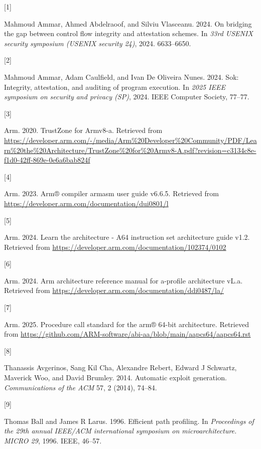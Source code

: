 \documentclass[a4paper, nobind]{templates/ociamthesis}
\newlength{\cslhangindent}
\newlength{\csllabelwidth}
\newenvironment{CSLReferences}[2] %
{\begin{list}{}{%
	\setlength{\itemindent}{0pt}
	\setlength{\leftmargin}{0pt}
	\setlength{\parsep}{0pt}
	\ifodd #1
	\setlength{\leftmargin}{\cslhangindent}
	\setlength{\itemindent}{-1\cslhangindent}
	\fi
	\setlength{\itemsep}{#2\baselineskip}}}
{\end{list}}
\newcommand{\CSLLeftMargin}[1]{\parbox[t]{\csllabelwidth}{\strut#1\strut}}
\newcommand{\CSLRightInline}[1]{\parbox[t]{\linewidth - \csllabelwidth}{\strut#1\strut}}
\begin{document}

\label{refs}
\begin{CSLReferences}{0}{0}
\CSLLeftMargin{{[}1{]} }%
\CSLRightInline{Mahmoud Ammar, Ahmed Abdelraoof, and Silviu Vlasceanu. 2024. On bridging the gap between control flow integrity and attestation schemes. In \emph{33rd USENIX security symposium (USENIX security 24)}, 2024. 6633--6650.}

\CSLLeftMargin{{[}2{]} }%
\CSLRightInline{Mahmoud Ammar, Adam Caulfield, and Ivan De Oliveira Nunes. 2024. Sok: Integrity, attestation, and auditing of program execution. In \emph{2025 IEEE symposium on security and privacy (SP)}, 2024. IEEE Computer Society, 77--77.}

\CSLLeftMargin{{[}3{]} }%
\CSLRightInline{Arm. 2020. TrustZone for Armv8-a. Retrieved from \url{https://developer.arm.com/-/media/Arm\%20Developer\%20Community/PDF/Learn\%20the\%20Architecture/TrustZone\%20for\%20Armv8-A.pdf?revision=c3134c8e-f1d0-42ff-869e-0e6a6bab824f}}

\CSLLeftMargin{{[}4{]} }%
\CSLRightInline{Arm. 2023. Arm® compiler armasm user guide v6.6.5. Retrieved from \url{https://developer.arm.com/documentation/dui0801/l}}

\CSLLeftMargin{{[}5{]} }%
\CSLRightInline{Arm. 2024. Learn the architecture - A64 instruction set architecture guide v1.2. Retrieved from \url{https://developer.arm.com/documentation/102374/0102}}

\CSLLeftMargin{{[}6{]} }%
\CSLRightInline{Arm. 2024. Arm architecture reference manual for a-profile architecture vL.a. Retrieved from \url{https://developer.arm.com/documentation/ddi0487/la/}}

\CSLLeftMargin{{[}7{]} }%
\CSLRightInline{Arm. 2025. Procedure call standard for the arm® 64-bit architecture. Retrieved from \url{https://github.com/ARM-software/abi-aa/blob/main/aapcs64/aapcs64.rst}}

\CSLLeftMargin{{[}8{]} }%
\CSLRightInline{Thanassis Avgerinos, Sang Kil Cha, Alexandre Rebert, Edward J Schwartz, Maverick Woo, and David Brumley. 2014. Automatic exploit generation. \emph{Communications of the ACM} 57, 2 (2014), 74--84.}

\CSLLeftMargin{{[}9{]} }%
\CSLRightInline{Thomas Ball and James R Larus. 1996. Efficient path profiling. In \emph{Proceedings of the 29th annual IEEE/ACM international symposium on microarchitecture. MICRO 29}, 1996. IEEE, 46--57.}


\end{CSLReferences}
\end{document}
